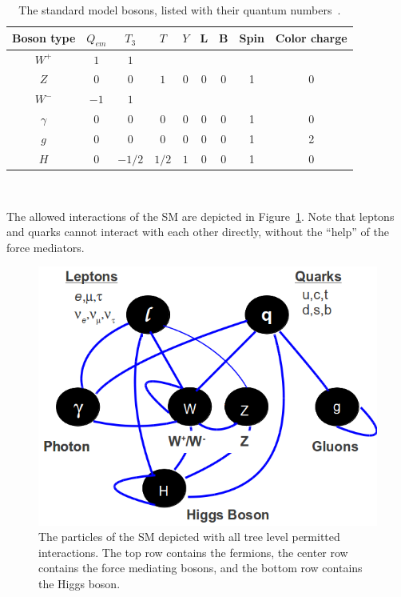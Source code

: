 \begin{table}[!Hhtbp]
\begin{tabular}{|c|cccc|cc|c|c|}
\hline
{Boson type}  & {$Q_{em}$}& {$T_{3}$}& {$T$} &{$Y$} & {L}& {B} &{Spin} &{Color charge}\\
\hline
\hline
{$W^{+}$}  & {$1$}& {$1$}& \multirow{3}{*}{$1$} &\multirow{3}{*}{$0$} & \multirow{3}{*}{0}& \multirow{3}{*}{0} &\multirow{3}{*}{1} &\multirow{3}{*}{0}\\
{$Z$}  & {$0$}& {$0$}& {} &{} & {}& {} &{} &{}\\
{$W^{-}$}  & {$-1$}& {$1$}& {} &{} & {}& {} &{} &{}\\
\hline
{$\gamma$}  & {$0$}& {$0$}& {$0$} &{$0$} & {0}& {$0$} &{1} &{0}\\
\hline
{$g$}  & {$0$}& {$0$}& {0} &{0} & {0}& {0} &{1} &{2}\\
\hline
{$H$}  & {$0$}& {$-1/2$}& {$1/2$} &{$1$} & {0}& {0} &{1} &{0}\\
\hline


\end{tabular}
\\
\caption[The bosons and their quantum numbers]{The standard model bosons, listed with their quantum numbers~\cite{PhysRevD.86.010001,HalzenAndMartin}.}
\label{tab:BosonTable}
\end{table}


The allowed interactions of the SM are depicted in Figure~\ref{figapp:SMInteractions}.  Note that leptons and quarks cannot interact with each other directly, without the ``help'' of the force mediators.


\begin{figure}[!Hh]
       \centering
       \includegraphics[scale=0.65]{Figures/SM_Interactions.png} 
       \caption[The particles of the Standard Model and their permitted interactions]{The particles of the SM depicted with all tree level permitted interactions.  The top row contains the fermions, the center row contains the force mediating bosons, and the bottom row contains the Higgs boson.}
\label{figapp:SMInteractions}
\end{figure}


